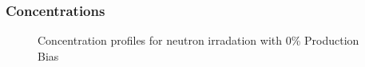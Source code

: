 \documentclass[a4paper]{article}
\begin{document}
    \subsubsection{Concentrations} \hspace{10pt}
      \begin{figure}[h!]  %
        \centering
        \qquad
        \caption{Concentration profiles for neutron irradation with 0\% Production Bias}
        \label{figure:concentrations_neutron_0_1e-6}
      \end{figure}
\end{document}
